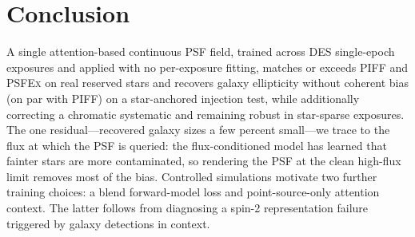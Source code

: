\documentclass[twocolumn]{aastex701}
\begin{document}
\section{Conclusion} \label{sec:conclusion}

A single attention-based continuous PSF field, trained across DES single-epoch exposures
and applied with no per-exposure fitting, matches or exceeds \textsc{PIFF} and
\textsc{PSFEx} on real reserved stars and recovers galaxy ellipticity without coherent
bias (on par with \textsc{PIFF}) on a star-anchored injection test, while additionally
correcting a chromatic systematic and remaining robust in star-sparse exposures. The one
residual---recovered galaxy sizes a few percent small---we trace to the flux at which the
PSF is queried: the flux-conditioned model has learned that fainter stars are more
contaminated, so rendering the PSF at the clean high-flux limit removes most of the bias.
Controlled simulations motivate two further training choices: a blend forward-model loss and
point-source-only attention context. The latter follows from diagnosing a spin-2
representation failure triggered by galaxy detections in context.
\end{document}
